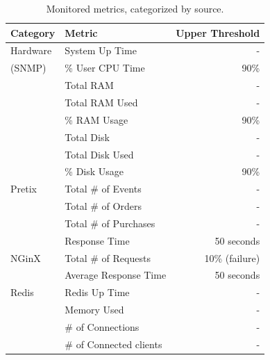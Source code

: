 \documentclass[12pt]{article}
\begin{document}
\begin{table}[h!]
  \begin{center}
    \begin{tabular}{l|l|r}
      \hline
      \textbf{Category}   & \textbf{Metric}         & \textbf{Upper Threshold}  \\
      \hline 
      Hardware            & System Up Time          & -                         \\
      (SNMP)              & \% User CPU Time        & 90\%                      \\
                          & Total RAM               & -                         \\
                          & Total RAM Used          & -                         \\
                          & \% RAM Usage            & 90\%                      \\
                          & Total Disk              & -                         \\
                          & Total Disk Used         & -                         \\
                          & \% Disk Usage           & 90\%                      \\
      \hline
      Pretix              & Total \# of Events      & -                         \\
                          & Total \# of Orders      & -                         \\
                          & Total \# of Purchases   & -                         \\
                          & Response Time           & 50 seconds                \\
      \hline
      NGinX               & Total \# of Requests    & 10\% (failure)            \\
                          & Average Response Time   & 50 seconds                \\
      \hline
      Redis               & Redis Up Time           & -                         \\
                          & Memory Used             & -                         \\
                          & \# of Connections       & -                         \\
                          & \# of Connected clients & -                         \\
      \hline
    \end{tabular}
    \caption{Monitored metrics, categorized by source.}
    \label{tab:sla}
  \end{center}
\end{table}
\end{document}
